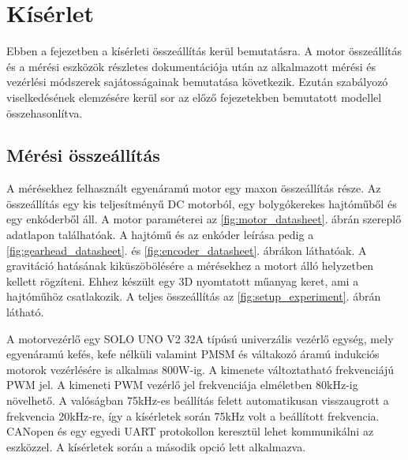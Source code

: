 \chapter{Kísérlet}\label{chap:experiment}

Ebben a fejezetben a kísérleti összeállítás kerül bemutatásra. A motor összeállítás és a mérési eszközök 
részletes dokumentációja után az alkalmazott mérési és vezérlési módszerek sajátosságainak bemutatása 
következik. Ezután szabályozó viselkedésének elemzésére kerül sor az előző fejezetekben bemutatott modellel 
összehasonlítva.

\section{Mérési összeállítás}
A mérésekhez felhasznált egyenáramú motor egy maxon összeállítás része. Az összeállítás egy 
kis teljesítményű DC motorból, egy bolygókerekes hajtóműből és egy enkóderből áll. A motor paraméterei
az \ref{fig:motor_datasheet}. ábrán szereplő adatlapon találhatóak. A hajtómű és az enkóder leírása pedig 
a \ref{fig:gearhead_datasheet}. és \ref{fig:encoder_datasheet}. ábrákon láthatóak. 
A gravitáció hatásának 
kiküszöbölésére a mérésekhez a motort álló helyzetben kellett rögzíteni. Ehhez készült egy 3D nyomtatott 
műanyag keret, ami a hajtóműhöz csatlakozik. A teljes összeállítás az \ref{fig:setup_experiment}. ábrán 
látható. 

A motorvezérlő egy SOLO UNO V2 32A típúsú univerzális vezérlő egység, mely egyenáramú kefés, kefe 
nélküli valamint PMSM és váltakozó áramú indukciós motorok vezérlésére is alkalmas 800W-ig. 
A kimenete változtatható frekvenciájú PWM jel. A kimeneti PWM vezérlő jel frekvenciája elméletben 80kHz-ig 
növelhető. A valóságban 75kHz-es beállítás felett automatikusan visszaugrott a frekvencia 20kHz-re, így 
a kísérletek során 75kHz volt a beállított frekvencia. CANopen és egy egyedi UART 
protokollon keresztül lehet kommunikálni az eszközzel. A kísérletek során a második opció lett alkalmazva.





